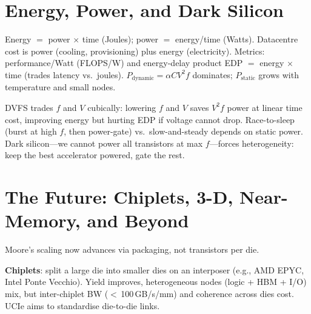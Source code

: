 \section{Energy, Power, and Dark Silicon}
Energy $=$ power $\times$ time (Joules); power $=$ energy/time (Watts). Datacentre cost
is power (cooling, provisioning) plus energy (electricity). Metrics: performance/Watt
(FLOPS/W) and energy-delay product EDP $=$ energy $\times$ time (trades latency vs.\
joules). $P_{\text{dynamic}}= \alpha CV^2 f$ dominates; $P_{\text{static}}$ grows with
temperature and small nodes.

DVFS trades $f$ and $V$ cubically: lowering $f$ and $V$ saves $V^2f$ power at linear
time cost, improving energy but hurting EDP if voltage cannot drop. Race-to-sleep (burst
at high $f$, then power-gate) vs.\ slow-and-steady depends on static power. Dark
silicon---we cannot power all transistors at max $f$---forces heterogeneity: keep the
best accelerator powered, gate the rest.

\begin{center}
\end{center}

\section{The Future: Chiplets, 3-D, Near-Memory, and Beyond}
Moore's scaling now advances via packaging, not transistors per die.

\textbf{Chiplets}: split a large die into smaller dies on an interposer (e.g., AMD EPYC,
Intel Ponte Vecchio). Yield improves, heterogeneous nodes (logic + HBM + I/O) mix, but
inter-chiplet BW ($<$\,100\,GB/s/mm) and coherence across dies cost. UCIe aims to
standardise die-to-die links.


